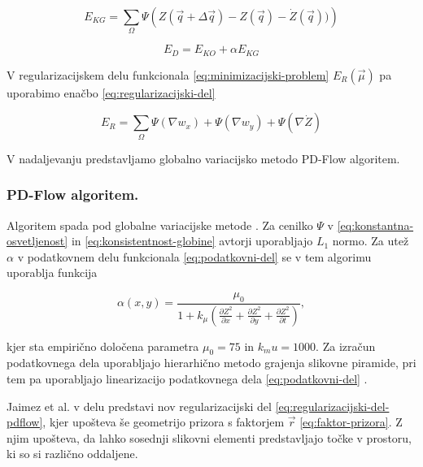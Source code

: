 \begin{equation}\label{eq:konsistentnost-globine}
	E_{KG} = \sum_\Omega \Psi\left( Z(\vec{q} + \Delta \vec{q}) - Z(\vec{q}) - \dot{Z}(\vec{q}))\right)
\end{equation}

\begin{equation}\label{eq:podatkovni-del}
	E_D = E_{KO} + \alpha E_{KG}
\end{equation}

V regularizacijskem delu funkcionala \eqref{eq:minimizacijski-problem} $E_R(\vec{\mu})$ pa uporabimo enačbo \eqref{eq:regularizacijski-del}

\begin{equation}\label{eq:regularizacijski-del}
	E_R = \sum_\Omega \Psi\left( \nabla w_x \right) + \Psi\left( \nabla w_y \right) + \Psi\left( \nabla \dot{Z} \right)
\end{equation}

V nadaljevanju predstavljamo globalno variacijsko metodo PD-Flow algoritem.


\subsubsection{PD-Flow algoritem.}\label{sec:pd-flow}
Algoritem spada pod globalne variacijske metode \cite{jaimez2015primal}. Za cenilko $\Psi$ v \eqref{eq:konstantna-osvetljenost} in \eqref{eq:konsistentnost-globine} avtorji uporabljajo $L_1$ normo. Za utež $\alpha$ v podatkovnem delu funkcionala \eqref{eq:podatkovni-del} se v tem algorimu uporablja funkcija 

\begin{equation}\label{eq:utez}
 \alpha(x,y) = \frac{\mu_0}{1 + k_\mu \left( \frac{\partial Z^2}{\partial x} + \frac{\partial Z^2}{\partial y} + \frac{\partial Z^2}{\partial t} \right)},
\end{equation}

kjer sta empirično določena parametra $\mu_0 = 75$ in $k_mu = 1000$. Za izračun podatkovnega dela uporabljajo hierarhično metodo grajenja slikovne piramide, pri tem pa uporabljajo linearizacijo podatkovnega dela \eqref{eq:podatkovni-del} \cite{jaimez2015primal}.

Jaimez et al. v delu \cite{jaimez2015primal} predstavi nov regularizacijski del \eqref{eq:regularizacijski-del-pdflow}, kjer upošteva še geometrijo prizora s faktorjem $\vec{r}$ \eqref{eq:faktor-prizora}. Z njim upošteva, da lahko sosednji slikovni elementi predstavljajo točke v prostoru, ki so si različno oddaljene.

